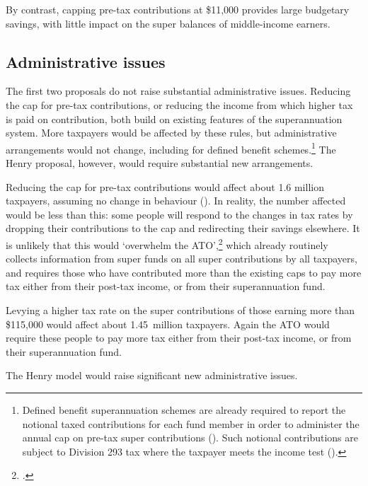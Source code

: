 By contrast, capping pre-tax contributions at \$11,000 provides large budgetary savings, with little impact on the super balances of middle-income earners. 

\subsection{Administrative issues}
The first two proposals do not raise substantial administrative issues. Reducing the cap for pre-tax contributions, or reducing the income from which higher tax is paid on contribution, both build on existing features of the superannuation system. More taxpayers would be affected by these rules, but administrative arrangements would not change, including for defined benefit schemes.\footnote{Defined benefit superannuation schemes are already required to report the notional taxed contributions for each fund member in order to administer the annual cap on pre-tax super contributions (\textcite{ATO2015DefinedBenefitFundsNotionalTaxedContributions}). Such notional contributions are subject to Division 293 tax where the taxpayer meets the income test (\textcite{ATO2015AssessingYourDiv293TaxDebt}).}  The Henry proposal, however, would require substantial new arrangements.

Reducing the cap for pre-tax contributions would affect about 1.6 million taxpayers, assuming no change in behaviour (). In reality, the number affected would be less than this: some people will respond to the changes in tax rates by dropping their contributions to the cap and redirecting their savings elsewhere. It is unlikely that this would ‘overwhelm the ATO’,\footcite{Sloan2015a}  which already routinely collects information from super funds on all super contributions by all taxpayers, and requires those who have contributed more than the existing caps to pay more tax either from their post-tax income, or from their superannuation fund.

Levying a higher tax rate on the super contributions of those earning more than \$115,000 would affect about 1.45~million taxpayers. Again the ATO would require these people to pay more tax either from their post-tax income, or from their superannuation fund.

The Henry model would raise significant new administrative issues.

